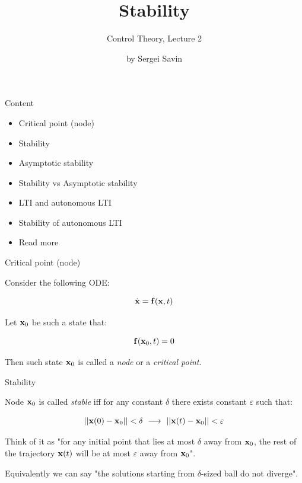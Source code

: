 \documentclass{beamer}
\title{Stability}
\subtitle{Control Theory, Lecture 2}
\author{by Sergei Savin}
\date{\mydate}
\begin{document}
\maketitle


\begin{frame}{Content}

\begin{itemize}
\item Critical point (node)
\item Stability
\item Asymptotic stability
\item Stability vs Asymptotic stability
\item LTI and autonomous LTI
\item Stability of autonomous LTI
\item Read more
\end{itemize}

\end{frame}



\begin{frame}{Critical point (node)}
\begin{flushleft}

Consider the following ODE:

\begin{equation}
    \dot{\mathbf{x}} = \mathbf{f} (\mathbf{x}, t)
\end{equation}

Let $\mathbf{x}_0$ be such a state that:

\begin{equation}
    \mathbf{f} (\mathbf{x}_0, t) = 0
\end{equation}

Then such state $\mathbf{x}_0$ is called a \emph{node} or a \emph{critical point}.

\end{flushleft}
\end{frame}



\begin{frame}{Stability}
\begin{flushleft}

Node $\mathbf{x}_0$ is called \emph{stable} iff for any constant $\delta$ there exists constant $\varepsilon$ such that:

\begin{equation}
    ||\bo{x}(0) - \bo{x}_0|| < \delta \ \longrightarrow \ ||\bo{x}(t) - \bo{x}_0|| < \varepsilon
\end{equation}

\bigskip

Think of it as "for any initial point that lies at most $\delta$ away from $\mathbf{x}_0$, the rest of the trajectory $\mathbf{x}(t)$ will be at most $\varepsilon$ away from $\mathbf{x}_0$".

\bigskip

Equivalently we can say "the solutions starting from $\delta$-sized ball do not diverge".

\end{flushleft}
\end{frame}
\end{document}
